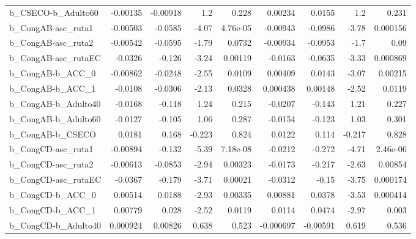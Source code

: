 \begin{tabular}{lrrrrrrrr}
b\_CSECO-b\_Adulto60         &    -0.00135 &     -0.00918 &      1.2 &    0.228 &    0.00234 &      0.0155 &          1.2 &         0.231 \\
b\_CongAB-asc\_ruta1         &    -0.00503 &      -0.0585 &    -4.07 & 4.76e-05 &   -0.00943 &     -0.0986 &        -3.78 &      0.000156 \\
b\_CongAB-asc\_ruta2         &    -0.00542 &      -0.0595 &    -1.79 &   0.0732 &   -0.00934 &     -0.0953 &         -1.7 &          0.09 \\
b\_CongAB-asc\_rutaEC        &     -0.0326 &       -0.126 &    -3.24 &  0.00119 &    -0.0163 &     -0.0635 &        -3.33 &      0.000869 \\
b\_CongAB-b\_ACC\_0           &    -0.00862 &      -0.0248 &    -2.55 &   0.0109 &    0.00409 &      0.0143 &        -3.07 &       0.00215 \\
b\_CongAB-b\_ACC\_1           &     -0.0108 &      -0.0306 &    -2.13 &   0.0328 &   0.000438 &     0.00148 &        -2.52 &        0.0119 \\
b\_CongAB-b\_Adulto40        &     -0.0168 &       -0.118 &     1.24 &    0.215 &    -0.0207 &      -0.143 &         1.21 &         0.227 \\
b\_CongAB-b\_Adulto60        &     -0.0127 &       -0.105 &     1.06 &    0.287 &    -0.0154 &      -0.123 &         1.03 &         0.301 \\
b\_CongAB-b\_CSECO           &      0.0181 &        0.168 &   -0.223 &    0.824 &     0.0122 &       0.114 &       -0.217 &         0.828 \\
b\_CongCD-asc\_ruta1         &    -0.00894 &       -0.132 &    -5.39 & 7.18e-08 &    -0.0212 &      -0.272 &        -4.71 &      2.46e-06 \\
b\_CongCD-asc\_ruta2         &    -0.00613 &      -0.0853 &    -2.94 &  0.00323 &    -0.0173 &      -0.217 &        -2.63 &       0.00854 \\
b\_CongCD-asc\_rutaEC        &     -0.0367 &       -0.179 &    -3.71 &  0.00021 &    -0.0312 &       -0.15 &        -3.75 &      0.000174 \\
b\_CongCD-b\_ACC\_0           &     0.00514 &       0.0188 &    -2.93 &  0.00335 &    0.00881 &      0.0378 &        -3.53 &      0.000414 \\
b\_CongCD-b\_ACC\_1           &     0.00779 &        0.028 &    -2.52 &   0.0119 &     0.0114 &      0.0474 &        -2.97 &         0.003 \\
b\_CongCD-b\_Adulto40        &    0.000924 &      0.00826 &    0.638 &    0.523 &  -0.000697 &    -0.00591 &        0.619 &         0.536 \\

\end{tabular}
